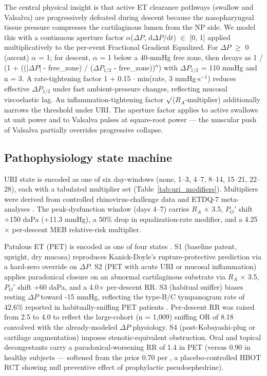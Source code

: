 \documentclass[11pt,a4paper]{article}
\begin{document}
The central physical insight is that active ET clearance pathways (swallow and Valsalva) are progressively defeated during descent because the nasopharyngeal tissue pressure compresses the cartilaginous lumen from the NP side. We model this with a continuous aperture factor $\alpha$($\Delta P$, $\mathrm{d}\Delta P/\mathrm{d}t$) $\in$ [0, 1] applied multiplicatively to the per-event Fractional Gradient Equalized. For $\Delta P$ $\geq$ 0 (ascent) $\alpha$ = 1; for descent, $\alpha$ = 1 below a 40-mmHg free zone, then decays as 1 / (1 + ((|$\Delta P$| - free\_zone) / ($\Delta P_{1/2}$ - free\_zone))$^{n}$) with $\Delta P_{1/2}$ = 110 mmHg and n = 3. A rate-tightening factor 1 + 0.15 $\cdot$ min(rate, 3 mmHg$\cdot$s$^{-1}$) reduces effective $\Delta P_{1/2}$ under fast ambient-pressure changes, reflecting mucosal viscoelastic lag. An inflammation-tightening factor $\surd$($R_A$-multiplier) additionally narrows the threshold under URI. The aperture factor applies to active swallows at unit power and to Valsalva pulses at square-root power --- the muscular push of Valsalva partially overrides progressive collapse.

\subsection{Pathophysiology state machine}

URI state is encoded as one of six day-windows (none, 1--3, 4--7, 8--14, 15--21, 22--28), each with a tabulated multiplier set (Table~\ref{tab:uri_modifiers}). Multipliers were derived from controlled rhinovirus-challenge data \citep{McBride1989,Buchman1994,Doyle1999} and ETDQ-7 meta-analyses \citep{Chen2022}. The peak-dysfunction window (days 4--7) carries $R_A$ $\times$ 3.5, $P_O'$ shift +150 daPa (+11.3 mmHg), a 50\% drop in equalization-rate modifier, and a 4.25$\times$ per-descent MEB relative-risk multiplier.

Patulous ET (PET) is encoded as one of four states \citep{Kobayashi2018,Kikuchi2017,Shindo2025}. S1 (baseline patent, upright, dry mucosa) reproduces Kanick-Doyle's rupture-protective prediction via a hard-zero override on $\Delta P$. S2 (PET with acute URI or mucosal inflammation) applies paradoxical closure on an abnormal cartilaginous substrate via $R_A$ $\times$ 3.5, $P_O'$ shift +60 daPa, and a 4.0$\times$ per-descent RR. S3 (habitual sniffer) biases resting $\Delta P$ toward -15 mmHg, reflecting the type-B/C tympanogram rate of 42.6\% reported in habitually-sniffing PET patients \citep{Shindo2025}. Per-descent RR was raised from 2.5 to 4.0 to reflect the \citet{Oshima2025} large-cohort (n = 1,009) sniffing OR of 8.18 convolved with the already-modeled $\Delta P$ physiology. S4 (post-Kobayashi-plug or cartilage augmentation) imposes stenotic-equivalent obstruction. Oral and topical decongestants carry a paradoxical-worsening RR of 1.4 in PET (versus 0.90 in healthy subjects --- softened from the prior 0.70 per \citet{Moayedi2025}, a placebo-controlled HBOT RCT showing null preventive effect of prophylactic pseudoephedrine).
\end{document}
